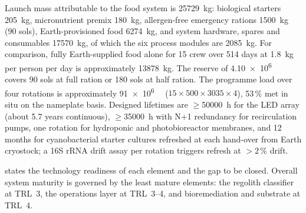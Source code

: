 \documentclass[11pt,a4paper,3p,authoryear]{elsarticle}
\begin{document}
Launch mass attributable to the food system is \SI{25729}{\kilo\gram}: biological starters \SI{205}{\kilo\gram}, micronutrient premix \SI{180}{\kilo\gram}, allergen-free emergency rations \SI{1500}{\kilo\gram} (90 sols), Earth-provisioned food \SI{6274}{\kilo\gram}, and system hardware, spares and consumables \SI{17570}{\kilo\gram}, of which the six process modules are \SI{2085}{\kilo\gram}. For comparison, fully Earth-supplied food alone for 15 crew over 514 days at \SI{1.8}{\kilo\gram} per person per day is approximately \SI{13878}{\kilo\gram}. The reserve of \SI{4.10e6}{\kilo\calorie} covers 90 sols at full ration or 180 sols at half ration. The programme load over four rotations is approximately \SI{91e6}{\kilo\calorie} ($15 \times 500 \times 3035 \times 4$), 53\,\% met in situ on the nameplate basis. Designed lifetimes are $\geq$\SI{50000}{\hour} for the LED array (about 5.7 years continuous), $\geq$\SI{35000}{\hour} with N+1 redundancy for recirculation pumps, one rotation for hydroponic and photobioreactor membranes, and 12 months for cyanobacterial starter cultures refreshed at each hand-over from Earth cryostock; a 16S rRNA drift assay per rotation triggers refresh at $>2\,\%$ drift.

 states the technology readiness of each element and the gap to be closed. Overall system maturity is governed by the least mature elements: the regolith classifier at TRL~3, the operations layer at TRL~3--4, and bioremediation and substrate at TRL~4.
\end{document}
